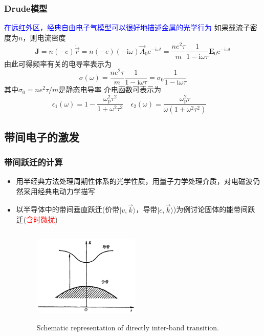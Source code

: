 {\frame
{
	\frametitle{\textrm{Drude}模型}
	\textcolor{blue}{在远红外区，经典自由电子气模型可以很好地描述金属的光学行为}
	如果载流子密度为$n$，则电流密度
	\begin{displaymath}
		\mathbf{J}=n(-e)\dot{\vec r}=n(-e)(-\mathrm{i}\omega)\vec A_0\mathrm{e}^{-\mathrm{i}\omega t}=\frac{ne^2\tau}m\frac1{1-\mathrm{i}\omega\tau}\mathbf{E}_0\mathrm{e}^{-\mathrm{i}\omega t}
	\end{displaymath}
	由此可得频率有关的电导率表示为
	\begin{displaymath}
		\sigma(\omega)=\frac{ne^2\tau}m\frac1{1-\mathrm{i}\omega\tau}=\sigma_0\frac1{1-\mathrm{i}\omega\tau}
	\end{displaymath}
	其中$\sigma_0=ne^2\tau/m$是静态电导率
	介电函数可表示为
	\begin{displaymath}
	\epsilon_1(\omega)=1-\frac{\omega_{\mathrm{p}}^2\tau^2}{1+\omega^2\tau^2}\quad \epsilon_2(\omega)=\frac{\omega_{\mathrm{p}}^2\tau}{\omega(1+\omega^2\tau^2)}\quad
\end{displaymath}
}

\subsection{带间电子的激发}
\frame
{
\frametitle{带间跃迁的计算}
\begin{itemize}
\setlength{\itemsep}{10pt}
	\item 用半经典方法处理周期性体系的光学性质，用量子力学处理介质，对电磁波仍然采用经典电动力学描写
	\item 以半导体中的带间垂直跃迁(价带$|v,\vec k\rangle$，导带$|c,\vec k\rangle$)为例讨论固体的能带间跃迁(\textcolor{red}{含时微扰})
\begin{figure}[h!]
\centering
\vspace*{-0.2in}
\includegraphics[height=1.8in,width=2.0in,viewport=0 0 1000 900,clip]{Figures/optic_dir.png}
\caption{\fontsize{8.0pt}{5.2pt}\selectfont\textrm{Schematic representation of directly inter-band transition.}}%
\label{Optic-dir}
\end{figure} 
\end{itemize}
}

}
